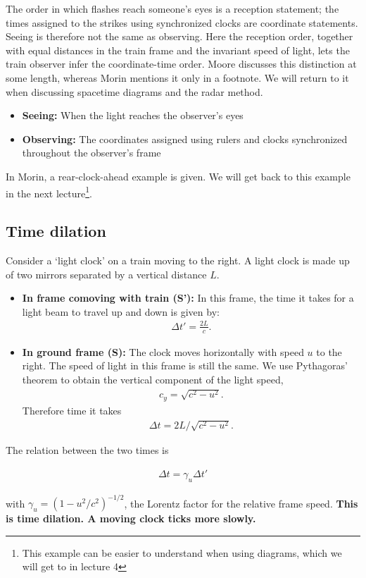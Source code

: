 \documentclass[12pt]{article}
\newcommand{\be}{\begin{eqnarray}}
\newcommand{\ee}{\end{eqnarray}}
\begin{document}
The order in which flashes reach someone's eyes is a reception statement; the times assigned to the strikes using synchronized clocks are coordinate statements. Seeing is therefore not the same as observing. Here the reception order, together with equal distances in the train frame and the invariant speed of light, lets the train observer infer the coordinate-time order. Moore discusses this distinction at some length, whereas Morin mentions it only in a footnote. We will return to it when discussing spacetime diagrams and the radar method.

\begin{tcolorbox}[colback=blue!5!white]
\begin{itemize}
\item {\bf Seeing:}
When the light reaches the observer's eyes   
\item {\bf Observing:} 
The coordinates assigned using rulers and clocks synchronized throughout the observer's frame
\end{itemize}
\end{tcolorbox}

In Morin, a rear-clock-ahead example is given. We will get back to this example in the next lecture\footnote{This example can be easier to understand when using diagrams, which we will get to in lecture 4}. 


\subsection{Time dilation}\label{sec:tD}
Consider a `light clock' on a train moving to the right. A light clock is made up of two mirrors separated by a vertical distance $L$. 
\begin{itemize}

\item \textbf{In frame comoving with train (S'):}
In this frame, the time it takes for a light beam to travel up and down is given by:
\be
\Delta t' = \frac{2L}{c}.
\ee
\noindent 
\item \textbf{In ground frame (S):} The clock moves horizontally with speed $u$ to the right. The speed of light in this frame is still the same. We use Pythagoras' theorem to obtain the vertical component of the light speed,
\be
c_y = \sqrt{c^2-u^2}.
\ee
Therefore time it takes 
\be
\Delta t = 2L/\sqrt{c^2-u^2}.
\ee
\end{itemize}
The relation between the two times is 
\begin{tcolorbox}[colback=blue!5!white]
\vspace{-1.3em}
\be
\Delta t =  \gamma_u \Delta t'
\ee
\end{tcolorbox}
\noindent
with $\gamma_u = (1-u^2/c^2)^{-1/2}$, the Lorentz factor for the relative frame speed. \textbf{This is time dilation. A moving clock ticks more slowly.}\\
\end{document}
